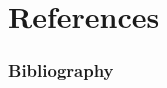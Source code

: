\documentclass{beamer}
\newcommand{\<}{\left\langle}
\renewcommand{\>}{\right\rangle} %
\renewcommand{\*}{\cdot} %
\begin{document}

\section{References}
\begin{frame}
\frametitle{Bibliography}
\nocite{*}


\end{frame}
\end{document}
